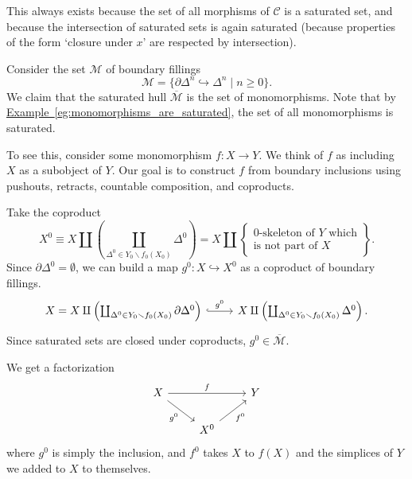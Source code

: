 \documentclass[main.tex]{subfiles}
\begin{document}
\begin{note}
  This always exists because the set of all morphisms of $\mathcal{C}$ is a saturated set, and because the intersection of saturated sets is again saturated (because properties of the form `closure under $x$' are respected by intersection).
\end{note}

\begin{example}
  Consider the set $\mathcal{M}$ of boundary fillings
  \begin{equation*}
    \mathcal{M} = \{\partial \Delta^{n} \hookrightarrow \Delta^{n} \mid n \geq 0\}.
  \end{equation*}
  We claim that the saturated hull $\overline{\mathcal{M}}$ is the set of monomorphisms. Note that by \hyperref[eg:monomorphisms_are_saturated]{Example~\ref*{eg:monomorphisms_are_saturated}}, the set of all monomorphisms is saturated.

  To see this, consider some monomorphism $f\colon X \to Y$. We think of $f$ as including $X$ as a subobject of $Y$. Our goal is to construct $f$ from boundary inclusions using pushouts, retracts, countable composition, and coproducts.

  Take the coproduct
  \begin{equation*}
    X^{0} \equiv X \amalg \left( \coprod_{\Delta^{0} \in Y_{0} \smallsetminus f_{0}(X_{0})} \Delta^{0} \right) = X \amalg \left\{ \substack{\text{0-skeleton of $Y$ which}\\\text{is not part of $X$}} \right\}.
  \end{equation*}
  Since $\partial \Delta^{0} = \emptyset$, we can build a map $g^{0}\colon X \hookrightarrow X^{0}$ as a coproduct of boundary fillings.
  \begin{equation*}
    \begin{tikzcd}
      X = X \amalg \left( \coprod_{\Delta^{0} \in Y_{0} \smallsetminus f_{0}(X_{0})} \partial \Delta^{0} \right)
      \arrow[hookrightarrow, r, "g^{0}"]
      & X \amalg \left( \coprod_{\Delta^{0} \in Y_{0} \smallsetminus f_{0}(X_{0})} \Delta^{0} \right).
    \end{tikzcd}
  \end{equation*}
  Since saturated sets are closed under coproducts, $g^{0} \in \overline{\mathcal{M}}$.

  We get a factorization
  \begin{equation*}
    \begin{tikzcd}
      X
      \arrow[rr, "f"]
      \arrow[dr, swap, "g^{0}"]
      && Y
      \\
      & X^{0}
      \arrow[ur, swap, "f^{0}"]
    \end{tikzcd}
  \end{equation*}
  where $g^{0}$ is simply the inclusion, and $f^{0}$ takes $X$ to $f(X)$ and the simplices of $Y$ we added to $X$ to themselves.


\end{example}
\end{document}

